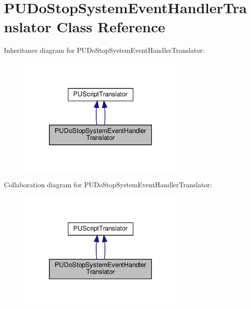\hypertarget{classPUDoStopSystemEventHandlerTranslator}{}\section{P\+U\+Do\+Stop\+System\+Event\+Handler\+Translator Class Reference}
\label{classPUDoStopSystemEventHandlerTranslator}


Inheritance diagram for P\+U\+Do\+Stop\+System\+Event\+Handler\+Translator\+:
\nopagebreak
\begin{figure}[H]
\begin{center}
\leavevmode
\includegraphics[width=237pt]{classPUDoStopSystemEventHandlerTranslator__inherit__graph}
\end{center}
\end{figure}


Collaboration diagram for P\+U\+Do\+Stop\+System\+Event\+Handler\+Translator\+:
\nopagebreak
\begin{figure}[H]
\begin{center}
\leavevmode
\includegraphics[width=237pt]{classPUDoStopSystemEventHandlerTranslator__coll__graph}
\end{center}
\end{figure}
